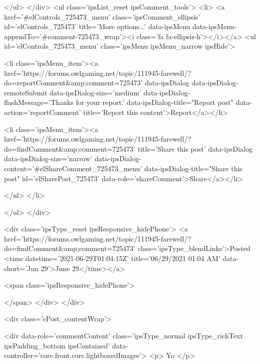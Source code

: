 					
					
					
					
				</ul>
			</div>
			<ul class='ipsList_reset ipsComment_tools'>
				<li>
					<a href='#elControls_725473_menu' class='ipsComment_ellipsis' id='elControls_725473' title='More options...' data-ipsMenu data-ipsMenu-appendTo='#comment-725473_wrap'><i class='fa fa-ellipsis-h'></i></a>
					<ul id='elControls_725473_menu' class='ipsMenu ipsMenu_narrow ipsHide'>
						
							<li class='ipsMenu_item'><a href='https://forums.owlgaming.net/topic/111945-farewell/?do=reportComment&amp;comment=725473' data-ipsDialog data-ipsDialog-remoteSubmit data-ipsDialog-size='medium' data-ipsDialog-flashMessage='Thanks for your report.' data-ipsDialog-title="Report post" data-action='reportComment' title='Report this content'>Report</a></li>
						
						
							<li class='ipsMenu_item'><a href='https://forums.owlgaming.net/topic/111945-farewell/?do=findComment&amp;comment=725473' title='Share this post' data-ipsDialog data-ipsDialog-size='narrow' data-ipsDialog-content='#elShareComment_725473_menu' data-ipsDialog-title="Share this post" id='elSharePost_725473' data-role='shareComment'>Share</a></li>
						
                        
						
						
						
							
								
							
							
							
							
							
							
						
					</ul>
				</li>
				
			</ul>
		</div>

		<div class='ipsType_reset ipsResponsive_hidePhone'>
			<a href='https://forums.owlgaming.net/topic/111945-farewell/?do=findComment&amp;comment=725473' class='ipsType_blendLinks'>Posted <time datetime='2021-06-29T01:04:15Z' title='06/29/2021 01:04  AM' data-short='Jun 29'>June 29</time></a> 
			
			<span class='ipsResponsive_hidePhone'>
				
				
			</span>
		</div>
	</div>

	

    

	<div class='cPost_contentWrap'>
		
		<div data-role='commentContent' class='ipsType_normal ipsType_richText ipsPadding_bottom ipsContained' data-controller='core.front.core.lightboxedImages'>
			<p>
	Yo
</p>


